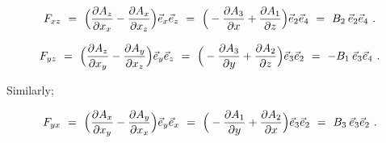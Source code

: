 \documentclass{article}
\begin{document}
\begin{equation} \label{eb-eq-1002-29}
F_{x z} \hspace{0.125cm} = \hspace{0.125cm}  \Big( \frac{\partial{A_{z}}}{\partial{x_{x}}} - \frac{\partial{A_{x}}}{\partial{x_{z}}} \Big) \vec{e}_{x} \vec{e}_{z} \hspace{0.125cm} = \hspace{0.125cm} \Big( - \frac{\partial{A_{3}}}{\partial{x}} + \frac{\partial{A_{1}}}{\partial{z}} \Big) \vec{e}_{2} \vec{e}_{4} \hspace{0.125cm} = \hspace{0.125cm} B_2 \hspace{0.075cm} \vec{e}_{2} \vec{e}_{4} \hspace{0.125cm} .
\end{equation}

\begin{equation} \label{eb-eq-1002-30}
F_{y z} \hspace{0.125cm} = \hspace{0.125cm}  \Big( \frac{\partial{A_{z}}}{\partial{x_{y}}} - \frac{\partial{A_{y}}}{\partial{x_{z}}} \Big) \vec{e}_{y} \vec{e}_{z} \hspace{0.125cm} = \hspace{0.125cm} \Big( - \frac{\partial{A_{3}}}{\partial{y}} + \frac{\partial{A_{2}}}{\partial{z}} \Big) \vec{e}_{3} \vec{e}_{2} \hspace{0.125cm} = \hspace{0.125cm} - B_1 \hspace{0.075cm} \vec{e}_{3} \vec{e}_{4} \hspace{0.125cm} .
\end{equation}

Similarly;

\begin{equation} \label{eb-eq-1002-31}
F_{y x} \hspace{0.125cm} = \hspace{0.125cm}  \Big( \frac{\partial{A_{x}}}{\partial{x_{y}}} - \frac{\partial{A_{y}}}{\partial{x_{x}}} \Big) \vec{e}_{y} \vec{e}_{x} \hspace{0.125cm} = \hspace{0.125cm} \Big( - \frac{\partial{A_{1}}}{\partial{y}} + \frac{\partial{A_{2}}}{\partial{x}} \Big) \vec{e}_{3} \vec{e}_{2} \hspace{0.125cm} = \hspace{0.125cm} B_3 \hspace{0.075cm} \vec{e}_{3} \vec{e}_{2} \hspace{0.125cm} .
\end{equation}
\end{document}
